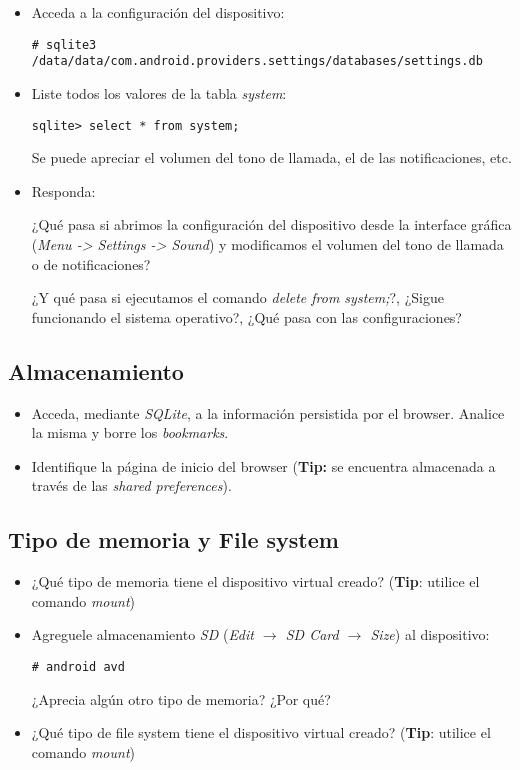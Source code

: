 \begin{itemize}
    \item Acceda a la configuración del dispositivo:
    \begin{lstlisting}
# sqlite3 /data/data/com.android.providers.settings/databases/settings.db
    \end{lstlisting}

    \item Liste todos los valores de la tabla \emph{system}:
    \begin{lstlisting}
sqlite> select * from system;
    \end{lstlisting}
    Se puede apreciar el volumen del tono de llamada, el de las notificaciones, etc.    
    
    \item Responda:
    \begin{questions}
	\question ¿Qué pasa si abrimos la configuración del dispositivo desde la interface gráfica (\emph{Menu -> Settings -> Sound}) y modificamos el volumen del tono de llamada o de notificaciones?
	
	\question ¿Y qué pasa si ejecutamos el comando \textit{delete from system;}?, ¿Sigue funcionando el sistema operativo?, ¿Qué pasa con las configuraciones?
    \end{questions}
\end{itemize}

\subsection{Almacenamiento}
\begin{itemize}
    \item Acceda, mediante \textit{SQLite}, a la información persistida por el browser. Analice la misma y borre los \textit{bookmarks}.

    \item Identifique la página de inicio del browser (\textbf{Tip:} se encuentra almacenada a través de las \textit{shared preferences}).    
\end{itemize}

\subsection{Tipo de memoria y File system}
\begin{itemize}
    \item ¿Qué tipo de memoria tiene el dispositivo virtual creado? (\textbf{Tip}: utilice el comando \textit{mount})
    
    \item Agreguele almacenamiento \textit{SD} (\emph{Edit $\rightarrow$ SD Card $\rightarrow$ Size}) al dispositivo:
    \begin{lstlisting}
# android avd
    \end{lstlisting}
    ¿Aprecia algún otro tipo de memoria? ¿Por qué?   
    
    \item ¿Qué tipo de file system tiene el dispositivo virtual creado? (\textbf{Tip}: utilice el comando \textit{mount})      
\end{itemize}

